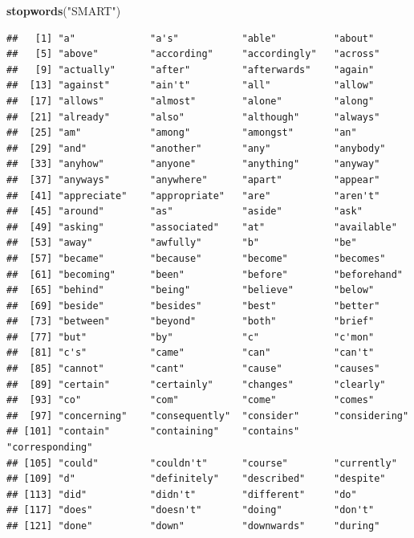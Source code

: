 \documentclass[]{book}
\newenvironment{Shaded}{\begin{snugshade}}{\end{snugshade}}
\newcommand{\KeywordTok}[1]{\textcolor[rgb]{0.13,0.29,0.53}{\textbf{{#1}}}}
\newcommand{\StringTok}[1]{\textcolor[rgb]{0.31,0.60,0.02}{{#1}}}
\newcommand{\NormalTok}[1]{{#1}}
\begin{document}
\begin{Shaded}
\begin{Highlighting}[]
\KeywordTok{stopwords}\NormalTok{(}\StringTok{"SMART"}\NormalTok{)}
\end{Highlighting}
\end{Shaded}

\begin{verbatim}
##   [1] "a"             "a's"           "able"          "about"        
##   [5] "above"         "according"     "accordingly"   "across"       
##   [9] "actually"      "after"         "afterwards"    "again"        
##  [13] "against"       "ain't"         "all"           "allow"        
##  [17] "allows"        "almost"        "alone"         "along"        
##  [21] "already"       "also"          "although"      "always"       
##  [25] "am"            "among"         "amongst"       "an"           
##  [29] "and"           "another"       "any"           "anybody"      
##  [33] "anyhow"        "anyone"        "anything"      "anyway"       
##  [37] "anyways"       "anywhere"      "apart"         "appear"       
##  [41] "appreciate"    "appropriate"   "are"           "aren't"       
##  [45] "around"        "as"            "aside"         "ask"          
##  [49] "asking"        "associated"    "at"            "available"    
##  [53] "away"          "awfully"       "b"             "be"           
##  [57] "became"        "because"       "become"        "becomes"      
##  [61] "becoming"      "been"          "before"        "beforehand"   
##  [65] "behind"        "being"         "believe"       "below"        
##  [69] "beside"        "besides"       "best"          "better"       
##  [73] "between"       "beyond"        "both"          "brief"        
##  [77] "but"           "by"            "c"             "c'mon"        
##  [81] "c's"           "came"          "can"           "can't"        
##  [85] "cannot"        "cant"          "cause"         "causes"       
##  [89] "certain"       "certainly"     "changes"       "clearly"      
##  [93] "co"            "com"           "come"          "comes"        
##  [97] "concerning"    "consequently"  "consider"      "considering"  
## [101] "contain"       "containing"    "contains"      "corresponding"
## [105] "could"         "couldn't"      "course"        "currently"    
## [109] "d"             "definitely"    "described"     "despite"      
## [113] "did"           "didn't"        "different"     "do"           
## [117] "does"          "doesn't"       "doing"         "don't"        
## [121] "done"          "down"          "downwards"     "during"       

\end{verbatim}
\end{document}
